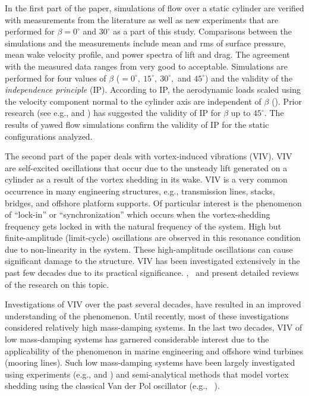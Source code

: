In the first part of the paper, simulations of flow over a static cylinder are
verified with measurements from the literature as well as new experiments that
are performed for $\beta=0^\circ$ and $30^\circ$ as a part of this study.
Comparisons between the simulations and the measurements include mean and rms
of surface pressure, mean wake velocity profile, and power spectra of lift and
drag. The agreement with the measured data ranges from very good to acceptable.
Simulations are performed for four values of $\beta$
($=0^\circ,~15^\circ,~30^\circ,$ and $45^\circ$) and the validity of the {\em
independence principle} (IP). According to IP, the aerodynamic loads scaled
using the velocity component normal to the cylinder axis are independent of
$\beta$ (\citet{zdravkovich2003flow}). Prior research (see e.g.,
\citet{franzini2009experimental} and \citet{zhao2009direct}) has suggested the
validity of IP for $\beta$ up to $45^\circ$. The results of yawed flow
simulations confirm the validity of IP for the static configurations analyzed.

The second part of the paper deals with vortex-induced vibrations (VIV).  VIV
are self-excited oscillations that occur due to the unsteady lift generated on
a cylinder as a result of the vortex shedding in its wake. VIV is a very common
occurrence in many engineering structures, e.g., transmission lines, stacks,
bridges, and offshore platform supports. Of particular interest is the
phenomenon of ``lock-in'' or ``synchronization'' which occurs when the
vortex-shedding frequency gets locked in with the natural frequency of the
system. High but finite-amplitude (limit-cycle) oscillations are observed in
this resonance condition due to non-linearity in the system. These
high-amplitude oscillations can cause significant damage to the structure. VIV
has been investigated extensively in the past few decades due to its practical
significance. \cite{bearman1984vortex},~\cite{sarpkaya2004critical} and
\cite{williamson2004vortex} present detailed reviews of the research on this
topic.

Investigations of VIV over the past several decades, have resulted in an
improved understanding of the phenomenon. Until recently, most of these
investigations considered relatively high mass-damping systems. In the last
two decades, VIV of low mass-damping systems has garnered considerable
interest due to the applicability of the phenomenon in marine engineering and
offshore wind turbines (mooring lines). Such low mass-damping systems have been
largely investigated using experiments (e.g., \citet{jain2013vortex} and
\citet{franzini2013one}) and semi-analytical methods that model vortex shedding
using the classical Van der Pol oscillator (e.g., ~\cite{xu2008high}). 

